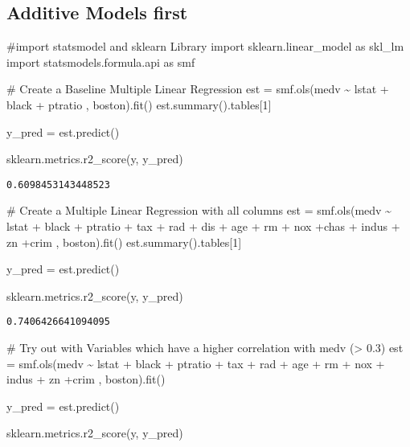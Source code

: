 \documentclass[
  letterpaper,
  DIV=11,
  numbers=noendperiod]{scrreprt}
\newenvironment{Shaded}{\begin{snugshade}}{\end{snugshade}}
\newcommand{\CommentTok}[1]{\textcolor[rgb]{0.37,0.37,0.37}{#1}}
\newcommand{\DecValTok}[1]{\textcolor[rgb]{0.68,0.00,0.00}{#1}}
\newcommand{\ImportTok}[1]{\textcolor[rgb]{0.00,0.46,0.62}{#1}}
\newcommand{\NormalTok}[1]{\textcolor[rgb]{0.00,0.23,0.31}{#1}}
\newcommand{\OperatorTok}[1]{\textcolor[rgb]{0.37,0.37,0.37}{#1}}
\newcommand{\StringTok}[1]{\textcolor[rgb]{0.13,0.47,0.30}{#1}}
\begin{document}
\hypertarget{additive-models-first}{%
\subsection{Additive Models first}\label{additive-models-first}}

\begin{Shaded}
\begin{Highlighting}[]
\CommentTok{\#import statsmodel and sklearn Library}
\ImportTok{import}\NormalTok{ sklearn.linear\_model }\ImportTok{as}\NormalTok{ skl\_lm}
\ImportTok{import}\NormalTok{ statsmodels.formula.api }\ImportTok{as}\NormalTok{ smf}

\CommentTok{\# Create a Baseline Multiple Linear Regression}
\NormalTok{est }\OperatorTok{=}\NormalTok{ smf.ols(}\StringTok{\textquotesingle{}medv \textasciitilde{} lstat + black + ptratio \textquotesingle{}}\NormalTok{, boston).fit()}
\NormalTok{est.summary().tables[}\DecValTok{1}\NormalTok{]}

\NormalTok{y\_pred }\OperatorTok{=}\NormalTok{ est.predict()}

\NormalTok{sklearn.metrics.r2\_score(y, y\_pred)}
\end{Highlighting}
\end{Shaded}

\begin{verbatim}
0.6098453143448523
\end{verbatim}

\begin{Shaded}
\begin{Highlighting}[]
\CommentTok{\# Create a Multiple Linear Regression with all columns}
\NormalTok{est }\OperatorTok{=}\NormalTok{ smf.ols(}\StringTok{\textquotesingle{}medv \textasciitilde{} lstat + black + ptratio + tax + rad + dis + age + rm + nox +chas + indus + zn +crim \textquotesingle{}}\NormalTok{, boston).fit()}
\NormalTok{est.summary().tables[}\DecValTok{1}\NormalTok{]}

\NormalTok{y\_pred }\OperatorTok{=}\NormalTok{ est.predict()}

\NormalTok{sklearn.metrics.r2\_score(y, y\_pred)}
\end{Highlighting}
\end{Shaded}

\begin{verbatim}
0.7406426641094095
\end{verbatim}

\begin{Shaded}
\begin{Highlighting}[]
\CommentTok{\# Try out with Variables which have a higher correlation with medv (\textgreater{} 0.3)}
\NormalTok{est }\OperatorTok{=}\NormalTok{ smf.ols(}\StringTok{\textquotesingle{}medv \textasciitilde{} lstat + black + ptratio + tax  + rad + age + rm + nox + indus + zn +crim \textquotesingle{}}\NormalTok{, boston).fit()}

\NormalTok{y\_pred }\OperatorTok{=}\NormalTok{ est.predict()}

\NormalTok{sklearn.metrics.r2\_score(y, y\_pred)}
\end{Highlighting}
\end{Shaded}
\end{document}
